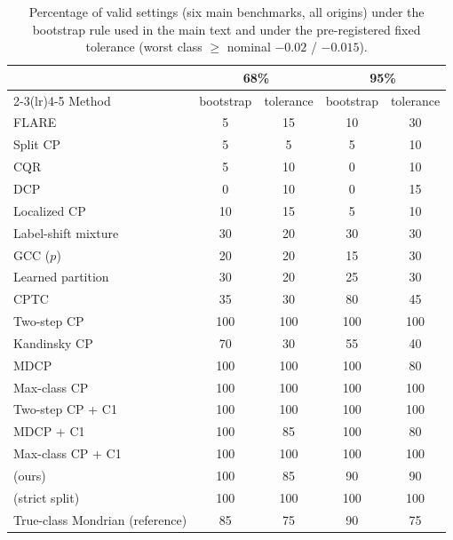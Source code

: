 \begin{table}[!htbp]
\centering
\caption{Percentage of valid settings (six main benchmarks, all origins) under the bootstrap rule used in the main text and under the pre-registered fixed tolerance (worst class $\ge$ nominal $-0.02$ / $-0.015$).}
\label{tab:validity}
\scriptsize
\begin{tabular}{lcccc}
\toprule
 & \multicolumn{2}{c}{68\%} & \multicolumn{2}{c}{95\%} \\
\cmidrule(lr){2-3}\cmidrule(lr){4-5}
Method & bootstrap & tolerance & bootstrap & tolerance \\
\midrule
FLARE & 5 & 15 & 10 & 30 \\
Split CP & 5 & 5 & 5 & 10 \\
CQR & 5 & 10 & 0 & 10 \\
DCP & 0 & 10 & 0 & 15 \\
Localized CP & 10 & 15 & 5 & 10 \\
Label-shift mixture & 30 & 20 & 30 & 30 \\
GCC ($p$) & 20 & 20 & 15 & 30 \\
Learned partition & 30 & 20 & 25 & 30 \\
CPTC & 35 & 30 & 80 & 45 \\
Two-step CP & 100 & 100 & 100 & 100 \\
Kandinsky CP & 70 & 30 & 55 & 40 \\
MDCP & 100 & 100 & 100 & 80 \\
Max-class CP & 100 & 100 & 100 & 100 \\
Two-step CP + C1 & 100 & 100 & 100 & 100 \\
MDCP + C1 & 100 & 85 & 100 & 80 \\
Max-class CP + C1 & 100 & 100 & 100 & 100 \\
\gamut{} (ours) & 100 & 85 & 90 & 90 \\
\gamut{} (strict split) & 100 & 100 & 100 & 100 \\
True-class Mondrian (reference) & 85 & 75 & 90 & 75 \\
\bottomrule
\end{tabular}
\end{table}
